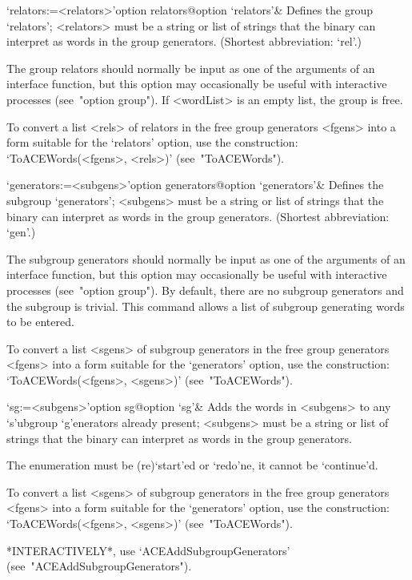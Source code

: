 \>`relators:=<relators>'{option relators}@{option `relators'}&
Defines the group `relators'; <relators> must be a string or  list  of
strings that the {\ACE} binary can interpret as  words  in  the  group
generators. (Shortest abbreviation: `rel'.)

The group relators should normally be input as one of the arguments of
an {\ACE} interface function, but  this  option  may  occasionally  be
useful with interactive processes (see~"option group"). If  <wordList>
is an empty list, the group is free.

To convert a  {\GAP}  list  <rels>  of  relators  in  the  free  group
generators <fgens> into a form suitable for the `relators' option, use
the construction: `ToACEWords(<fgens>, <rels>)' (see~"ToACEWords").

\>`generators:=<subgens>'{option  generators}@{option `generators'}&
Defines the subgroup `generators'; <subgens> must be a string or  list
of strings that the {\ACE} binary can interpret as words in the  group
generators. (Shortest abbreviation: `gen'.)

The subgroup generators  should  normally  be  input  as  one  of  the
arguments of  an  {\ACE}  interface  function,  but  this  option  may
occasionally  be  useful  with  interactive   processes   (see~"option
group"). By default, there are no subgroup generators and the subgroup
is trivial. This command allows a list of subgroup generating words to
be entered.

To convert a {\GAP} list <sgens> of subgroup generators  in  the  free
group generators <fgens> into a form  suitable  for  the  `generators'
option,   use   the   construction:   `ToACEWords(<fgens>,   <sgens>)'
(see~"ToACEWords").

\>`sg:=<subgens>'{option sg}@{option `sg'}&
Adds the words in <subgens> to  any  `s'ubgroup  `g'enerators  already
present; <subgens> must be a string or list of strings that the {\ACE}
binary can interpret as words in the group generators.

The enumeration must  be  (re)`start'ed  or  `redo'ne,  it  cannot  be
`continue'd.

To convert a {\GAP} list <sgens> of subgroup generators  in  the  free
group generators <fgens> into a form  suitable  for  the  `generators'
option,   use   the   construction:   `ToACEWords(<fgens>,   <sgens>)'
(see~"ToACEWords").

*INTERACTIVELY*,            use             `ACEAddSubgroupGenerators'
(see~"ACEAddSubgroupGenerators").

